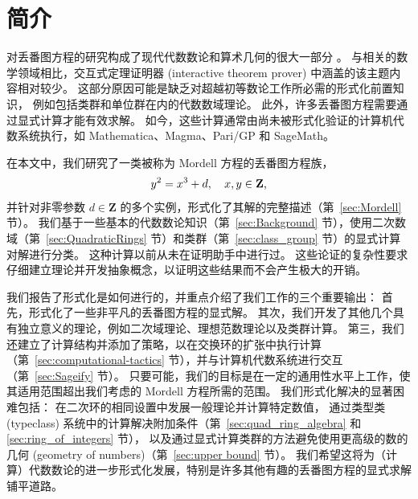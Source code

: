 \documentclass[sigplan,10pt,nonacm,
screen]{acmart} \settopmatter{printfolios=true,printccs=false,printacmref=false}
\newcommand{\ab}[1]{\todo[color=green]{AB: #1}}
\newcommand{\ZZ}{\mathbf{Z}}
\begin{document}


\maketitle

\section{简介}\label{sec:Intro}%

对丢番图方程的研究构成了现代代数数论和算术几何的很大一部分 \cite{cohen2007number}。
与相关的数学领域相比，交互式定理证明器 (interactive theorem prover) 中涵盖的该主题内容相对较少。
这部分原因可能是缺乏对超越初等数论工作所必需的形式化前置知识，
例如包括类群和单位群在内的代数数域理论。
此外，许多丢番图方程需要通过显式计算才能有效求解。
如今，这些计算通常由尚未被形式化验证的计算机代数系统执行，如 Mathematica、Magma、Pari/GP 和 SageMath。

在本文中，我们研究了一类被称为 Mordell 方程的丢番图方程族，
\begin{equation}\label{eqn:Mordell}
 y^2=x^3+d, \quad x,y \in \ZZ\text,
\end{equation}
并针对非零参数 $d \in \ZZ$ 的多个实例，形式化了其解的完整描述（第~\ref{sec:Mordell} 节）。
我们基于一些基本的代数数论知识（第~\ref{sec:Background} 节），使用二次数域（第~\ref{sec:QuadraticRings} 节）和类群（第~\ref{sec:class_group} 节）的显式计算对解进行分类。
这种计算以前从未在证明助手中进行过。
这些论证的复杂性要求仔细建立理论并开发抽象概念，以证明这些结果而不会产生极大的开销。

我们报告了形式化是如何进行的，并重点介绍了我们工作的三个重要输出：
首先，形式化了一些非平凡的丢番图方程的显式解。
其次，我们开发了其他几个具有独立意义的理论，例如二次域理论、理想范数理论以及类群计算。
第三，我们还建立了计算结构并添加了策略，以在交换环的扩张中执行计算（第~\ref{sec:computational-tactics} 节），并与计算机代数系统进行交互（第~\ref{sec:Sageify} 节）。
只要可能，我们的目标是在一定的通用性水平上工作，使其适用范围超出我们考虑的 Mordell 方程所需的范围。
我们形式化解决的显著困难包括：
在二次环的相同设置中发展一般理论并计算特定数值，
通过类型类 (typeclass) 系统中的计算解决附加条件（第~\ref{sec:quad_ring_algebra} 和 \ref{sec:ring_of_integers} 节），
以及通过显式计算类群的方法避免使用更高级的数的几何 (geometry of numbers)（第~\ref{sec:upper bound} 节）。
我们希望这将为（计算）代数数论的进一步形式化发展，特别是许多其他有趣的丢番图方程的显式求解铺平道路。
\end{document}
